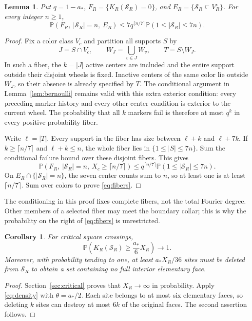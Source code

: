 \documentclass[11pt]{amsart}
\newtheorem{lemma}[theorem]{Lemma}
\newtheorem{corollary}[theorem]{Corollary}
\theoremstyle{remark}
\newcommand{\Prob}{\mathbb P}
\newcommand{\cS}{\mathcal S}
\newcommand{\astar}{a_*}
\begin{document}
\begin{lemma}\label{lem:fibers}
Put $q=1-\astar$, $F_R=\{K_R(\cS_R)=0\}$, and $E_R=\{\cS_R\subseteq V_R^\circ\}$. For every integer $n\ge1$,
\begin{equation}\label{eq:fibers}
 \Prob(F_R,\ |\cS_R|=n,\ E_R)
 \le7q^{\lceil n/7\rceil}\Prob(1\le|\cS_R|\le7n).
\end{equation}
\end{lemma}
\begin{proof}
Fix a color class $V_c$ and partition all supports $S$ by
\[
 J=S\cap V_c,\qquad W_J=\bigcup_{v\in J}W_v,
 \qquad T=S\setminus W_J.
\]
In such a fiber, the $k=|J|$ active centers are included and the entire support outside their disjoint wheels is fixed. Inactive centers of the same color lie outside $W_J$, so their absence is already specified by $T$. The conditional argument in Lemma~\ref{lem:bernoulli} remains valid with this extra exterior condition: every preceding marker history and every other center condition is exterior to the current wheel. The probability that all $k$ markers fail is therefore at most $q^k$ in every positive-probability fiber.

Write $\ell=|T|$. Every support in the fiber has size between $\ell+k$ and $\ell+7k$. If $k\ge\lceil n/7\rceil$ and $\ell+k\le n$, the whole fiber lies in $\{1\le|S|\le7n\}$. Sum the conditional failure bound over these disjoint fibers. This gives
\[
 \Prob(F_R,\ |\cS_R|=n,\ X_c\ge\lceil n/7\rceil)
 \le q^{\lceil n/7\rceil}\Prob(1\le|\cS_R|\le7n).
\]
On $E_R\cap\{|\cS_R|=n\}$, the seven center counts sum to $n$, so at least one is at least $\lceil n/7\rceil$. Sum over colors to prove \eqref{eq:fibers}.
\end{proof}

The conditioning in this proof fixes complete fibers, not the total Fourier degree. Other members of a selected fiber may meet the boundary collar; this is why the probability on the right of \eqref{eq:fibers} is unrestricted.

\begin{corollary}\label{cor:robust}
For critical square crossings,
\[
 \Prob\left(K_R(\cS_R)\ge\frac{\astar}{6}X_R\right)\longrightarrow1.
\]
Moreover, with probability tending to one, at least $\astar X_R/36$ sites must be deleted from $\cS_R$ to obtain a set containing no full interior elementary face.
\end{corollary}
\begin{proof}
Section~\ref{sec:critical} proves that $X_R\to\infty$ in probability. Apply \eqref{eq:density} with $\theta=\astar/2$. Each site belongs to at most six elementary faces, so deleting $k$ sites can destroy at most $6k$ of the original faces. The second assertion follows.
\end{proof}
\end{document}
